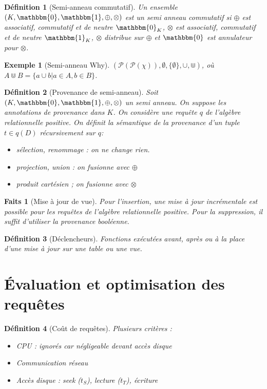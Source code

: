 \documentclass[landscape]{article}
\renewcommand{\P}{\mathscr{P}}
\newcommand{\1}{\mathbbm{1}}
\newcommand{\0}{\mathbbm{0}}
\newtheorem{defi}{Définition}
\newtheorem{fact}{Faits}
\newtheorem{ex}{Exemple}
\begin{document}
\begin{multicols}{2}
    \begin{defi}[Semi-anneau commutatif] Un ensemble $(K, \0, \1, \oplus, \otimes)$
        est un semi anneau commutatif si $\oplus$ est associatif, commutatif et
        de neutre $\0_K$, $\otimes$ est associatif, commutatif et de neutre
        $\1_K$, $\otimes$ distribue sur $\oplus$ et $\0$ est annulateur pour
        $\otimes$.
    \end{defi}

    \begin{ex}[Semi-anneau Why]
        $(\P(\P(\chi)), \emptyset, \{\emptyset\}, \cup, \Cup)$, où
        $A\Cup B = \{a\cup b | a\in A, b\in B\}$.
    \end{ex}

    \begin{defi}[Provenance de semi-anneau]
        Soit $(K, \0, \1, \oplus, \otimes)$ un semi anneau. On suppose les annotations
        de provenance dans $K$. On considère une requête $q$ de l'algèbre relationnelle
        positive. On définit la sémantique de la provenance d'un tuple $t\in q(D)$
        récursivement sur $q$: \begin{itemize}
            \item sélection, renommage : on ne change rien.
            \item projection, union : on fusionne avec $\oplus$
            \item produit cartésien ; on fusionne avec $\otimes$
        \end{itemize}
    \end{defi}

    \begin{fact}[Mise à jour de vue] Pour l'insertion, une mise à jour incrémentale
        est possible pour les requêtes de l'algèbre relationnelle positive. Pour
        la suppression, il suffit d'utiliser la provenance booléenne.
    \end{fact}
    
    \begin{defi}[Déclencheurs]
        Fonctions exécutées avant, après ou à la place d'une mise à jour sur une
        table ou une vue.
    \end{defi}

    \section{Évaluation et optimisation des requêtes}

    \begin{defi}[Coût de requêtes] Plusieurs critères :\begin{itemize}
        \item CPU : ignorés car négligeable devant accès disque
        \item Communication réseau
        \item Accès disque : seek ($t_S$), lecture ($t_T$), écriture
    \end{itemize}
    \end{defi}


\end{multicols}
\end{document}
